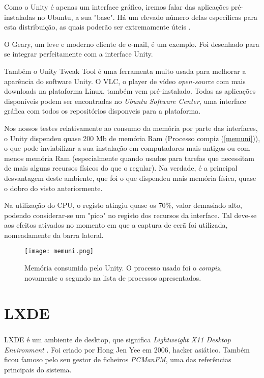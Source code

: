 \documentclass[11pt,openright,twoside]{report}
\begin{document}
Como o Unity é apenas um interface gráfico, iremos falar das aplicações pré-instaladas no Ubuntu, a sua "base". Há um elevado número delas específicas para esta distribuição, as quais poderão ser extremamente úteis \cite{AplicacoesUbuntu}.

O Geary, um leve e moderno cliente de e-mail, é um exemplo. Foi desenhado para se integrar perfeitamente com a interface Unity.

Também o Unity Tweak Tool é uma ferramenta muito usada para melhorar a aparência do software Unity. O VLC, o player de vídeo \textit{open-source} com mais downloads na plataforma Linux, também vem pré-instalado. Todas as aplicações disponíveis podem ser encontradas no \textit{Ubuntu Software Center}, uma interface gráfica com todos os repositórios disponveis para a plataforma.

Nos nossos testes relativamente ao consumo da memória por parte das interfaces, o Unity dispendeu quase 200 Mb de memória Ram (Processo compiz (\autoref{memuni})), o que pode inviabilizar a sua instalação em computadores mais antigos ou com menos memória Ram (especialmente quando usados para tarefas que necessitam de mais alguns recursos físicos do que o regular). Na verdade, é a principal desvantagem deste ambiente, que foi o que dispendeu mais memória física, quase o dobro do visto anteriormente.

Na utilização do CPU, o registo atingiu quase os 70\%, valor demasiado alto, podendo considerar-se um "pico" no registo dos recursos da interface. Tal deve-se aos efeitos ativados no momento em que a captura de ecrã foi utilizada, nomeadamente da barra lateral.

\begin{figure}
 \center
 \texttt{[image: memuni.png]}
 \caption{Memória consumida pelo Unity. O processo usado foi o \textit{compiz}, novamente o segundo na lista de processos apresentados.}
 \label{memuni}
\end{figure}




\chapter{LXDE}

\paragraph{   }LXDE é um ambiente de desktop, que significa \textit{Lightweight X11 Desktop Environment} \cite{LXDE}. Foi criado por Hong Jen Yee em 2006, hacker asiático. Também ficou famoso pelo seu gestor de ficheiros \textit{PCManFM}, uma das referências principais do sistema.
\end{document}
